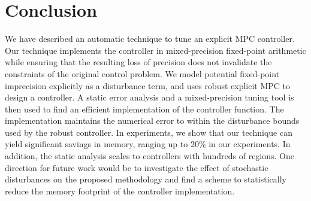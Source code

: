 \section{Conclusion}

We have described an automatic technique to tune an explicit MPC
controller.
Our technique implements the controller in mixed-precision fixed-point arithmetic
while ensuring that the resulting loss of precision does not invalidate the
constraints of the original control problem.
We model potential fixed-point imprecision explicitly as a disturbance
term, and uses robust explicit MPC to design a controller.
A static error analysis and a mixed-precision tuning tool is then 
used to find an efficient implementation of the controller function.
The implementation maintains the numerical error to within
the disturbance bounds used by the robust controller.
In experiments, we show that our technique can yield significant savings in memory,
ranging up to 20\% in our experiments. 
In addition, the static analysis scales to controllers with hundreds of regions.
One direction for future work would be to investigate the effect of stochastic disturbances on the proposed methodology and find a 
scheme to statistically reduce the memory footprint of the controller implementation.


